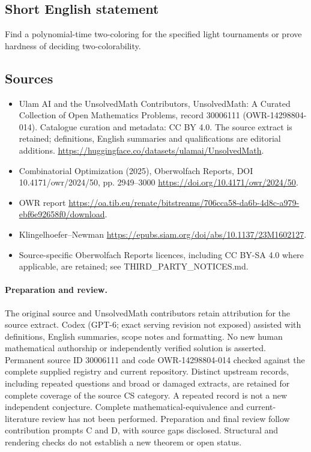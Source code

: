 \documentclass[11pt]{article}
\begin{document}
\subsection{Short English statement}
Find a polynomial-time two-coloring for the specified light tournaments or prove hardness of deciding two-colorability.
\subsection{Sources}
\begin{itemize}
\item[\hypertarget{source:30006111:1}{S1}] Ulam AI and the UnsolvedMath Contributors, UnsolvedMath: A Curated Collection of Open Mathematics Problems, record 30006111 (OWR-14298804-014). Catalogue curation and metadata: CC BY 4.0. The source extract is retained; definitions, English summaries and qualifications are editorial additions.
\url{https://huggingface.co/datasets/ulamai/UnsolvedMath}.
\item[\hypertarget{source:30006111:2}{S2}] Combinatorial Optimization (2025), Oberwolfach Reports, DOI 10.4171/owr/2024/50, pp. 2949--3000
\url{https://doi.org/10.4171/owr/2024/50}.
\item[\hypertarget{source:30006111:3}{S3}] OWR report
\url{https://oa.tib.eu/renate/bitstreams/706cca58-da6b-4d8c-a979-ebf6e92658f0/download}.
\item[\hypertarget{source:30006111:4}{S4}] Klingelhoefer--Newman
\url{https://epubs.siam.org/doi/abs/10.1137/23M1602127}.
\item Source-specific Oberwolfach Reports licences, including CC BY-SA 4.0 where applicable, are retained; see THIRD\_PARTY\_NOTICES.md.
\end{itemize}
\paragraph{Preparation and review.}
The original source and UnsolvedMath contributors retain attribution for the source extract. Codex (GPT-6; exact serving revision not exposed) assisted with definitions, English summaries, scope notes and formatting. No new human mathematical authorship or independently verified solution is asserted. Permanent source ID 30006111 and code OWR-14298804-014 checked against the complete supplied registry and current repository. Distinct upstream records, including repeated questions and broad or damaged extracts, are retained for complete coverage of the source CS category. A repeated record is not a new independent conjecture. Complete mathematical-equivalence and current-literature review has not been performed. Preparation and final review follow contribution prompts C and D, with source gaps disclosed. Structural and rendering checks do not establish a new theorem or open status.
\label{end:30006111}
\end{document}
